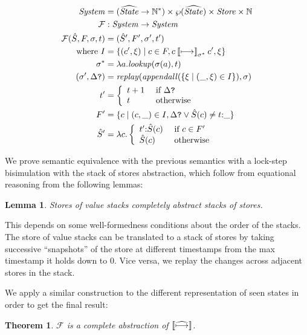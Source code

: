 \documentclass[preprint,onecolumn,9pt]{sigplanconf} %
\newtheorem{theorem}{Theorem}
\newtheorem{lemma}{Lemma}
\begin{document}
{\small
\begin{align*}
\mathit{System} &= (\widehat{\mathit{State}} \to {{\mathbb N}}^*) \times \wp(\widehat{\mathit{State}}) \times \mathit{Store} \times {\mathbb N} \\
{\mathcal F} &: \mathit{System} \to \mathit{System} \\
{\mathcal F}(\hat{S},F, \sigma,t) &= (\hat{S}',F',\sigma', t') \\
\text{ where }
I &= \{(c',\xi) \mid
       c \in F,
       c \mathbin{\llbracket\mathbin{\longmapsto}\rrbracket}_{\sigma^*} c',\xi\} \\
\sigma^* &= \lambda a.\mathit{lookup}(\sigma(a),t) \\
(\sigma', \Delta\mbox{{\tt ?}}) &= \mathit{replay}(\mathit{appendall}(\{\xi \mid (\_,\xi) \in I\}),\sigma) \\
t' &= \left\{\begin{array}{ll} t+1 & \text{ if } \Delta\mbox{{\tt ?}} \\
              t   & \text{ otherwise}
             \end{array}\right. \\
F' &= \{c \mid (c,\_) \in I, \Delta\mbox{{\tt ?}} \vee \hat{S}(c) \neq t {\tt :} \_\} \\
\hat{S}' &= \lambda c. \left\{\begin{array}{ll}
                               t' {\tt :} \hat{S}(c) & \text{ if } c \in F' \\
                               \hat{S}(c) & \text{ otherwise}
                             \end{array}\right.
\end{align*}}

We prove semantic equivalence with the previous semantics with a
lock-step bisimulation with the stack of stores abstraction, which
follow from equational reasoning from the following lemmas:

\begin{lemma}
Stores of value stacks completely abstract stacks of stores.
\end{lemma}
This depends on some well-formedness conditions about the order of the
stacks. The store of value stacks can be translated to a stack of
stores by taking successive ``snapshots'' of the store at different
timestamps from the max timestamp it holds down to 0. Vice versa, we
replay the changes across adjacent stores in the stack.

We apply a similar construction to the different representation of seen states in order to get the final result:

\begin{theorem}
${\mathcal F}$ is a complete abstraction of $\mathbin{\llbracket\widehat{\mathbin{\longmapsto}}\rrbracket}$.
\end{theorem}
\end{document}
